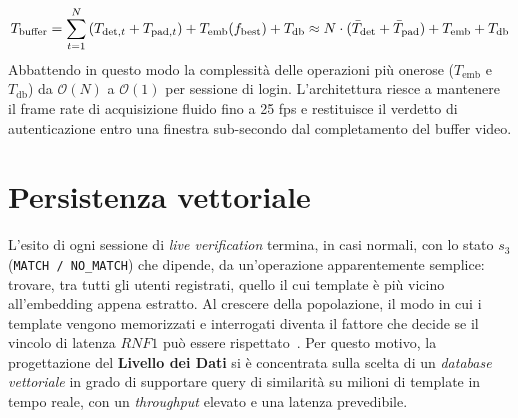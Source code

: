 \begin{equation}
    \label{eq:latenzaTotaleBuffer}
    T_{\text{buffer}} = \sum_{t=1}^{N} \left( T_{\text{det}, t} + T_{\text{pad}, t} \right) + T_{\text{emb}}(f_{\text{best}}) + T_{\text{db}}\\ \approx N \cdot (\bar{T}_{\text{det}} + \bar{T}_{\text{pad}}) + T_{\text{emb}} + T_{\text{db}}
\end{equation}
Abbattendo in questo modo la complessità delle operazioni più onerose ($T_{\text{emb}}$ e $T_{\text{db}}$) da $\mathcal{O}(N)$ a $\mathcal{O}(1)$ per sessione di login. L'architettura riesce a mantenere il frame rate di acquisizione fluido fino a 25 fps e restituisce il verdetto di autenticazione entro una finestra sub-secondo dal completamento del buffer video.



\section{Persistenza vettoriale}\label{cap:2.4-persistenza}
L'esito di ogni sessione di \textit{live verification} termina, in casi normali, con lo stato $s_3$ (\texttt{MATCH / NO\_MATCH}) che dipende, da un'operazione apparentemente semplice: trovare, tra tutti gli utenti registrati, quello il cui template è più vicino all'embedding appena estratto.
Al crescere della popolazione, il modo in cui i template vengono memorizzati e interrogati diventa il fattore che decide se il vincolo di latenza $RNF1$ può essere rispettato~\cite{panSurveyVectorDatabase2023}.
Per questo motivo, la progettazione del \textbf{Livello dei Dati} si è concentrata sulla scelta di un \textit{database vettoriale} in grado di supportare query di similarità su milioni di template in tempo reale, con un \textit{throughput} elevato e una latenza prevedibile.

